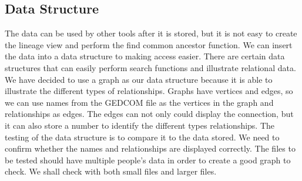 \documentclass[onecolumn, draftclsnofoot, 10pt, compsoc]{IEEEtran}
\begin{document}
\subsection{Data Structure}
\begin{singlespace}
The data can be used by other tools after it is stored, but it is not easy to create the lineage view and perform the find common ancestor function. We can insert the data into a data structure to making access easier. There are certain data structures that can easily perform search functions and illustrate relational data. We have decided to use a graph as our data structure because it is able to illustrate the different types of relationships. Graphs have vertices and edges, so we can use names from the GEDCOM file as the vertices in the graph and relationships as edges. The edges can not only could display the connection, but it can also store a number to identify the different types relationships.  
\newline
\newline
The testing of the data structure is to compare it to the data stored. We need to confirm whether the names and relationships are displayed correctly. The files to be tested should have multiple people's data in order to create a good graph to check. We shall check with both small files and larger files.
\end{singlespace}
\end{document}
